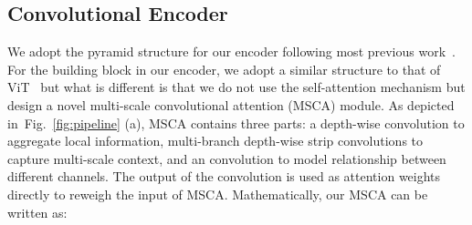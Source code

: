 \documentclass{article}
\newcommand{\figref}[1]{Fig.~\ref{#1}}
\begin{document}
\subsection{Convolutional Encoder}
\label{sec:encoder}



We adopt the pyramid structure for our encoder following most previous work~\cite{xie2021segformer,chen2017deeplab,fu2019dual}.
For the building block in our encoder, we adopt a similar structure to
that of ViT~\cite{dosovitskiy2020image,xie2021segformer} but what is different
is that we do not use the self-attention mechanism but design a novel multi-scale
convolutional attention (MSCA) module.
As depicted in~\figref{fig:pipeline} (a), MSCA contains three parts: 
a depth-wise convolution to aggregate local information, multi-branch depth-wise strip convolutions to capture multi-scale context, and an  convolution to 
model relationship between different channels.
The output of the  convolution is used as attention weights directly
to reweigh the input of MSCA.
Mathematically, our MSCA can be written as:
\vspace{-5pt}
\end{document}
